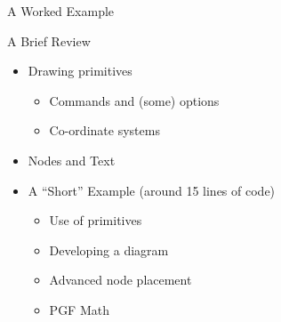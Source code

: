 \begin{frame}[plain]{A Worked Example}
	
\end{frame}

\begin{frame}{A Brief Review}
	\begin{itemize}
		\item Drawing primitives
		\begin{itemize}
			\item Commands and (some) options
			\item Co-ordinate systems
		\end{itemize}
		\item Nodes and Text
		\item A ``Short'' Example (around 15 lines of code)
		\begin{itemize}
			\item Use of primitives
			\item Developing a diagram
			\item Advanced node placement
			\item PGF Math
		\end{itemize}
	\end{itemize}
\end{frame}
